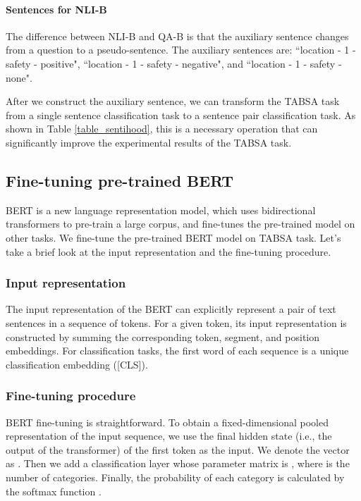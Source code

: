 \documentclass[11pt,a4paper]{article}
\theoremstyle{definition}
\begin{document}
	\paragraph{Sentences for NLI-B}
	The difference between NLI-B and QA-B is that the auxiliary sentence changes from a question to a pseudo-sentence. The auxiliary sentences are: ``location - 1 - safety - positive", ``location - 1 - safety - negative", and ``location - 1 - safety - none".
	
	After we construct the auxiliary sentence, we can transform the TABSA task from a single sentence classification task to a sentence pair classification task. As shown in Table \ref{table_sentihood}, this is a necessary operation that can significantly improve the experimental results of the TABSA task.
	
	\subsection{Fine-tuning pre-trained BERT}
	BERT \cite{devlin2018bert} is a new language representation model, which uses bidirectional transformers to pre-train a large corpus, and fine-tunes the pre-trained model on other tasks. We fine-tune the pre-trained BERT model on TABSA task. Let's take a brief look at the input representation and the fine-tuning procedure.
	
	\subsubsection{Input representation} The input representation of the BERT can explicitly represent a pair of text sentences in a sequence of tokens. For a given token, its input representation is constructed by summing the corresponding token, segment, and position embeddings. For classification tasks, the first word of each sequence is a unique classification embedding ([CLS]).
	
	\subsubsection{Fine-tuning procedure} BERT fine-tuning is straightforward. To obtain a fixed-dimensional pooled representation of the input sequence, we use the final hidden state (i.e., the output of the transformer) of the first token as the input. We denote the vector as . Then we add a classification layer whose parameter matrix is , where  is the number of categories. Finally, the probability of each category  is calculated by the softmax function .
	
\end{document}
